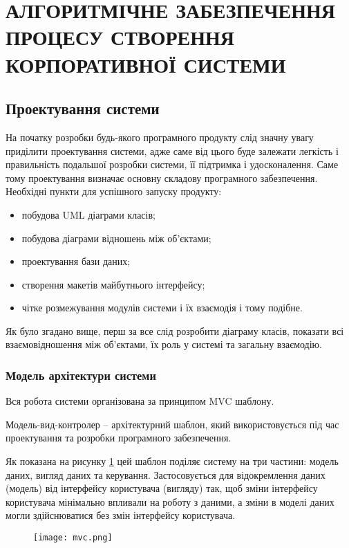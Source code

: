 \section{АЛГОРИТМІЧНЕ ЗАБЕЗПЕЧЕННЯ ПРОЦЕСУ СТВОРЕННЯ КОРПОРАТИВНОЇ СИСТЕМИ}

\subsection{Проектування системи}
На початку розробки будь-якого програмного продукту слід значну увагу приділити проектування системи, адже саме від цього буде залежати легкість і правильність подальшої розробки системи, її підтримка і удосконалення.
Саме тому проектування визначає основну складову програмного забезпечення. 
Необхідні пункти для успішного запуску  продукту:
\begin{itemize}
	\item побудова UML діаграми класів;
	\item побудова діаграми відношень між об'єктами;
	\item проектування бази даних;
	\item створення макетів майбутнього інтерфейсу;
	\item чітке розмежування модулів системи і їх взаємодія і тому подібне.
\end{itemize}

\par Як було згадано вище, перш за все слід розробити діаграму класів, показати всі взаємовідношення між об'єктами, їх роль у системі та загальну взаємодію.
\subsubsection{Модель архітектури системи}
Вся робота системи організована за принципом MVC шаблону.
\par Модель-вид-контролер -- архітектурний шаблон, який використовується під час проектування та розробки програмного забезпечення.
\par Як показана на рисунку \ref{pic:mvc} цей шаблон поділяє систему на три частини: модель даних, вигляд даних та керування. Застосовується для відокремлення даних (модель) від інтерфейсу користувача (вигляду) так, щоб зміни інтерфейсу користувача мінімально впливали на роботу з даними, а зміни в моделі даних могли здійснюватися без змін інтерфейсу користувача.

\begin{figure}[!ht]
\centering
		\texttt{[image: mvc.png]}
		\label{pic:mvc}
\end{figure}

